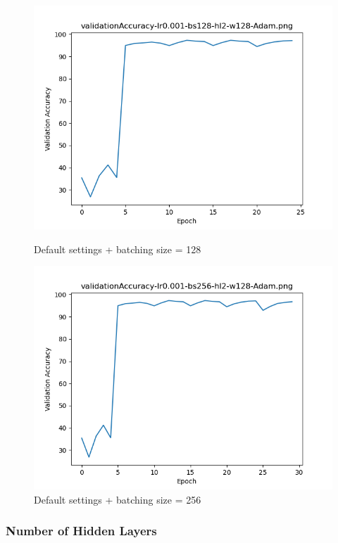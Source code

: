 \documentclass{article}[12pt]
\begin{document}
        \begin{figure}[H]
        \includegraphics[width=\linewidth]{testsResults/validationAccuracy/validationAccuracy-lr0.001-bs128-hl2-w128-Adam.png}
        \caption{Default settings + batching size = 128}
        \endminipage
        \includegraphics[width=\linewidth]{testsResults/validationAccuracy/validationAccuracy-lr0.001-bs256-hl2-w128-Adam.png}
        \caption{Default settings + batching size = 256}
        \endminipage
    \end{figure}

\subsubsection{Number of Hidden Layers}
\end{document}
